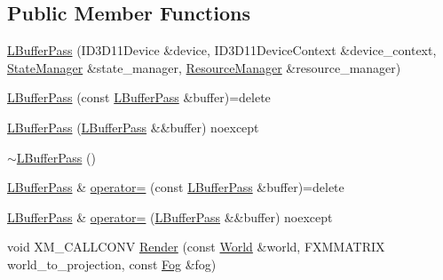 \subsection*{Public Member Functions}
\begin{DoxyCompactItemize}
\item 
\hyperlink{classmage_1_1rendering_1_1_l_buffer_pass_a5462eea6f50ed0371185584442d1d21e}{L\+Buffer\+Pass} (I\+D3\+D11\+Device \&device, I\+D3\+D11\+Device\+Context \&device\+\_\+context, \hyperlink{classmage_1_1rendering_1_1_state_manager}{State\+Manager} \&state\+\_\+manager, \hyperlink{classmage_1_1rendering_1_1_resource_manager}{Resource\+Manager} \&resource\+\_\+manager)
\item 
\hyperlink{classmage_1_1rendering_1_1_l_buffer_pass_a575a6e93e446b4d9a0af33844dce0035}{L\+Buffer\+Pass} (const \hyperlink{classmage_1_1rendering_1_1_l_buffer_pass}{L\+Buffer\+Pass} \&buffer)=delete
\item 
\hyperlink{classmage_1_1rendering_1_1_l_buffer_pass_a708f765ebb9416b9e9258f78c926331e}{L\+Buffer\+Pass} (\hyperlink{classmage_1_1rendering_1_1_l_buffer_pass}{L\+Buffer\+Pass} \&\&buffer) noexcept
\item 
\hyperlink{classmage_1_1rendering_1_1_l_buffer_pass_a91261b9de58ca001a4e78cc1dd2c1f4b}{$\sim$\+L\+Buffer\+Pass} ()
\item 
\hyperlink{classmage_1_1rendering_1_1_l_buffer_pass}{L\+Buffer\+Pass} \& \hyperlink{classmage_1_1rendering_1_1_l_buffer_pass_a14814e64f1e99f3144944bea07932a20}{operator=} (const \hyperlink{classmage_1_1rendering_1_1_l_buffer_pass}{L\+Buffer\+Pass} \&buffer)=delete
\item 
\hyperlink{classmage_1_1rendering_1_1_l_buffer_pass}{L\+Buffer\+Pass} \& \hyperlink{classmage_1_1rendering_1_1_l_buffer_pass_aeab4dadf9d131fbfaadb28acfde5c575}{operator=} (\hyperlink{classmage_1_1rendering_1_1_l_buffer_pass}{L\+Buffer\+Pass} \&\&buffer) noexcept
\item 
void X\+M\+\_\+\+C\+A\+L\+L\+C\+O\+NV \hyperlink{classmage_1_1rendering_1_1_l_buffer_pass_af8a112e82a85455a371c496d3b1c6030}{Render} (const \hyperlink{classmage_1_1rendering_1_1_world}{World} \&world, F\+X\+M\+M\+A\+T\+R\+IX world\+\_\+to\+\_\+projection, const \hyperlink{classmage_1_1rendering_1_1_fog}{Fog} \&fog)
\end{DoxyCompactItemize}
